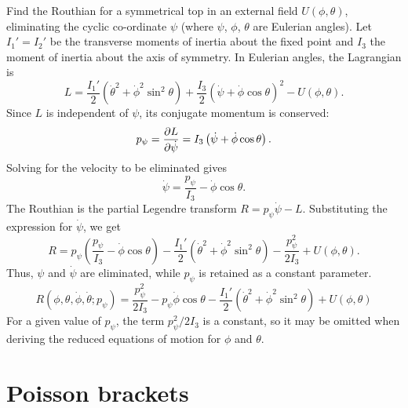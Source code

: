 
\begin{problem}[title={Routhian of a symmetrical top}]
{
Find the Routhian for a symmetrical top in an external field $U(\phi, \theta)$, eliminating the cyclic co-ordinate $\psi$ (where $\psi$, $\phi$, $\theta$ are Eulerian angles).
}
{
Let $I_1' = I_2'$ be the transverse moments of inertia about the fixed point and $I_3$ the moment of inertia about the axis of symmetry. In Eulerian angles, the Lagrangian is
\begin{equation*}
    L = \frac{I_1'}{2}\left(\Dot{\theta}^2 + \Dot{\phi}^2\sin^2{\theta}\right) + \frac{I_3}{2}\left(\Dot{\psi} + \Dot{\phi}\cos{\theta}\right)^2 - U(\phi, \theta).
\end{equation*}
Since $L$ is independent of $\psi$, its conjugate momentum is conserved:
\begin{equation*}
    p_\psi = \frac{\partial L}{\partial \Dot{\psi}} = I_3\left(\Dot{\psi} + \Dot{\phi}\cos{\theta}\right).
\end{equation*}
Solving for the velocity to be eliminated gives
\begin{equation*}
    \Dot{\psi} = \frac{p_\psi}{I_3} - \Dot{\phi}\cos{\theta}.
\end{equation*}
The Routhian is the partial Legendre transform $R = p_\psi\Dot{\psi} - L$. Substituting the expression for $\Dot{\psi}$, we get
\begin{equation*}
    R = p_\psi\left(\frac{p_\psi}{I_3} - \Dot{\phi}\cos{\theta}\right) - \frac{I_1'}{2}\left(\Dot{\theta}^2 + \Dot{\phi}^2\sin^2{\theta}\right) - \frac{p_\psi^2}{2I_3} + U(\phi, \theta).
\end{equation*}
Thus, $\psi$ and $\Dot{\psi}$ are eliminated, while $p_\psi$ is retained as a constant parameter.
}
{
\begin{equation*}
    R(\phi, \theta, \Dot{\phi}, \Dot{\theta}; p_\psi) = \frac{p_\psi^2}{2I_3} - p_\psi\Dot{\phi}\cos{\theta} - \frac{I_1'}{2}\left(\Dot{\theta}^2 + \Dot{\phi}^2\sin^2{\theta}\right) + U(\phi, \theta)
\end{equation*}
}
For a given value of $p_\psi$, the term $p_\psi^2/2I_3$ is a constant, so it may be omitted when deriving the reduced equations of motion for $\phi$ and $\theta$.
\end{problem}

\section{Poisson brackets}

